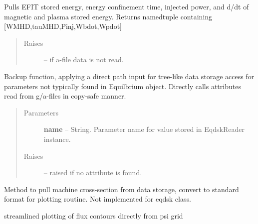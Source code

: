 \documentclass[letterpaper,10pt,english]{sphinxmanual}
\begin{document}
\begin{fulllineitems}
\begin{fulllineitems}
\label{eqtools:eqtools.eqdskreader.EqdskReader.getEnergy}
Pulls EFIT stored energy, energy confinement time, injected power, and d/dt of magnetic and plasma stored energy.
Returns namedtuple containing {[}WMHD,tauMHD,Pinj,Wbdot,Wpdot{]}
\begin{quote}\begin{description}
\item[{Raises }] \leavevmode
{} -- 
if a-file data is not read.

\end{description}\end{quote}

\end{fulllineitems}


\begin{fulllineitems}
\label{eqtools:eqtools.eqdskreader.EqdskReader.getParam}
Backup function, applying a direct path input for tree-like data storage access
for parameters not typically found in Equilbrium object.  Directly calls attributes
read from g/a-files in copy-safe manner.
\begin{quote}\begin{description}
\item[{Parameters }] \leavevmode
\textbf{name} --
String.  Parameter name for value stored in EqdskReader instance.

\item[{Raises }] \leavevmode
{} -- 
raised if no attribute is found.

\end{description}\end{quote}

\end{fulllineitems}


\begin{fulllineitems}
\label{eqtools:eqtools.eqdskreader.EqdskReader.getMachineCrossSection}
Method to pull machine cross-section from data storage, convert to standard format for plotting routine.
Not implemented for eqdsk class.

\end{fulllineitems}


\begin{fulllineitems}
\label{eqtools:eqtools.eqdskreader.EqdskReader.plotFlux}
streamlined plotting of flux contours directly from psi grid

\end{fulllineitems}


\end{fulllineitems}
\end{document}
